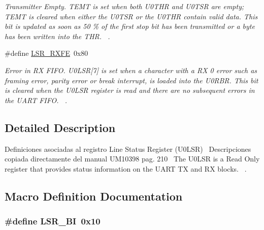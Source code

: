 \begin{DoxyCompactItemize}
\begin{DoxyCompactList}\small\item\em Transmitter Empty. T\+E\+MT is set when both U0\+T\+HR and U0\+T\+SR are empty; T\+E\+MT is cleared when either the U0\+T\+SR or the U0\+T\+HR contain valid data. This bit is updated as soon as 50 \% of the first stop bit has been transmitted or a byte has been written into the T\+HR.~\newline
. \end{DoxyCompactList}\item 
\#define \hyperlink{group___r_e_g_i_s_t_r_o___l_s_r_gad481ff8993ac05c71d4ca3b611833df0}{L\+S\+R\+\_\+\+R\+X\+FE}~0x80
\begin{DoxyCompactList}\small\item\em Error in RX F\+I\+FO. U0\+L\+SR\mbox{[}7\mbox{]} is set when a character with a RX 0 error such as framing error, parity error or break interrupt, is loaded into the U0\+R\+BR. This bit is cleared when the U0\+L\+SR register is read and there are no subsequent errors in the U\+A\+RT F\+I\+FO.~\newline
. \end{DoxyCompactList}\end{DoxyCompactItemize}


\subsection{Detailed Description}
Definiciones asociadas al registro Line Status Register (U0\+L\+SR)~\newline
 Descripciones copiada directamente del manual U\+M10398 pag. 210~\newline
 The U0\+L\+SR is a Read Only register that provides status information on the U\+A\+RT TX and RX blocks.~\newline
. 



\subsection{Macro Definition Documentation}
\subsubsection[{\texorpdfstring{L\+S\+R\+\_\+\+BI}{LSR_BI}}]{\setlength{\rightskip}{0pt plus 5cm}\#define L\+S\+R\+\_\+\+BI~0x10}\hypertarget{group___r_e_g_i_s_t_r_o___l_s_r_ga0fa2f414cac085b768774f2881321b60}{}\label{group___r_e_g_i_s_t_r_o___l_s_r_ga0fa2f414cac085b768774f2881321b60}


